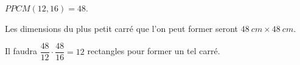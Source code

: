 %
%
    \(PPCM(12,16) = 48\).

    Les dimensions du plus petit carré que l'on peut former seront \(\SI{48}{cm}\times\SI{48}{cm}\).

    Il faudra \(\dfrac{48}{12}\cdot\dfrac{48}{16} = 12\) rectangles pour former un tel carré.
